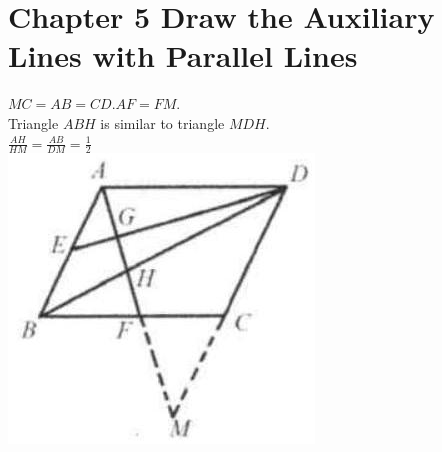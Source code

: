 \documentclass[10pt]{article}
\begin{document}
\section*{Chapter 5 Draw the Auxiliary Lines with Parallel Lines}
\(M C=A B=C D . A F=F M\).\\
Triangle \(A B H\) is similar to triangle \(M D H\).\\
\(\frac{A H}{H M}=\frac{A B}{D M}=\frac{1}{2}\)\\
\includegraphics[max width=\textwidth, center]{2025_04_17_97bc1f7e44d93c271a88g-141(3)}
\end{document}
